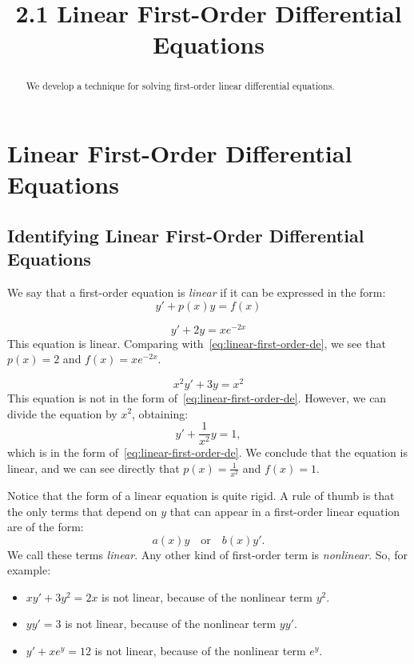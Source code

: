 \documentclass{ximera}
\title{2.1 Linear First-Order Differential Equations}
\begin{document}
 
\begin{abstract}
We develop a technique for solving first-order linear differential equations.
\end{abstract}
 
\maketitle
 
\section*{Linear First-Order Differential Equations}
\subsection*{Identifying Linear First-Order Differential Equations}
 
We say that a first-order equation is \textit{linear} if it can be expressed in the form:
\begin{equation}
\label{eq:linear-first-order-de}
y'+p(x)y=f(x)
\end{equation}
\begin{example}\label{ex:linearex1}
$$y'+2y=xe^{-2x}$$
This equation is linear. Comparing with~\eqref{eq:linear-first-order-de}, we see that $p(x)=2$ and $f(x)=xe^{-2x}$.
\end{example}
 
\begin{example}\label{ex:linearex2}
$$x^2y'+3y=x^2$$
This equation is not in the form of~\eqref{eq:linear-first-order-de}. However, we can divide the equation by $x^2$, obtaining:
$$
y'+\frac{1}{x^2}y=1,
$$
which is in the form of~\eqref{eq:linear-first-order-de}. We conclude that the equation is linear, and we can see directly that $p(x)=\frac{1}{x^2}$ and $f(x)=1$.
\end{example}
Notice that the form of a linear equation is quite rigid. A rule of thumb is that the only terms that depend on $y$ that can appear in a first-order linear equation are of the form:
\[
a(x)y\quad\text{or}\quad b(x)y'.
\]
We call these terms \textit{linear}. Any other kind of first-order term is \textit{nonlinear}. So, for example:
\begin{itemize}
\item $\displaystyle xy'+3y^2=2x$ is not linear, because of the nonlinear term $y^2$.
\item $\displaystyle yy' = 3$ is not linear, because of the nonlinear term $yy'$.
\item $\displaystyle y'+xe^y=12$ is not linear, because of the nonlinear term $e^y$.
\end{itemize}
 
\end{document}
